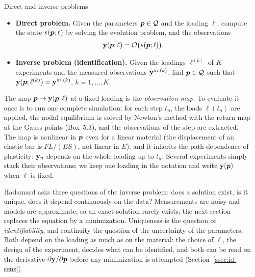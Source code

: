 \begin{gbox}{Direct and inverse problems}\label{def:id-direct}
\begin{itemize}
  \item \textbf{Direct problem.} Given the parameters $\bm{p}\in\mathcal Q$ and the loading
  $\ell$, compute the state $s(\bm{p};\ell)$ by solving the evolution problem, and the
  observations
  \begin{equation}\label{eq:id-obsmap}
    \mathbf{y}(\bm{p};\ell)=\mathcal O\bigl(s(\bm{p};\ell)\bigr).
  \end{equation}
  \item \textbf{Inverse problem (identification).} Given the loadings
  $\ell^{(k)}$ of $K$ experiments and the measured observations
  $\mathbf{y}^{m,(k)}$, find $\bm{p}\in\mathcal Q$ such that
  $\mathbf{y}(\bm{p};\ell^{(k)})=\mathbf{y}^{m,(k)}$, $k=1,\dots,K$.
\end{itemize}
\end{gbox}
\noindent The map $\bm{p}\mapsto\mathbf{y}(\bm{p};\ell)$ at a fixed loading is the
\emph{observation map}. To evaluate it once is to run one complete simulation:
for each step $t_n$, the loads $\ell(t_n)$ are applied, the nodal equilibrium is
solved by Newton's method with the return map at the Gauss points (Box~5.3), and
the observations of the step are extracted. The map is nonlinear in $\bm{p}$ even
for a linear material (the displacement of an elastic bar is $FL/(ES)$, not linear
in $E$), and it inherits the path dependence of plasticity: $\mathbf{y}_n$ depends
on the whole loading up to $t_n$. Several experiments simply stack their
observations; we keep one loading in the notation and write $\mathbf{y}(\bm{p})$ when
$\ell$ is fixed.

Hadamard asks three questions of the inverse problem: does a solution exist, is
it unique, does it depend continuously on the data? Measurements are noisy and
models are approximate, so an exact solution rarely exists; the next section
replaces the equation by a minimization. Uniqueness is the question of
\emph{identifiability}, and continuity the question of the uncertainty of the
parameters. Both depend on the loading as much as on the material: the choice of
$\ell$, the design of the experiment, decides what can be identified, and both
can be read on the derivative $\partial\mathbf{y}/\partial\bm{p}$ before any minimization
is attempted (Section~\ref{ssec:id-sens}).

